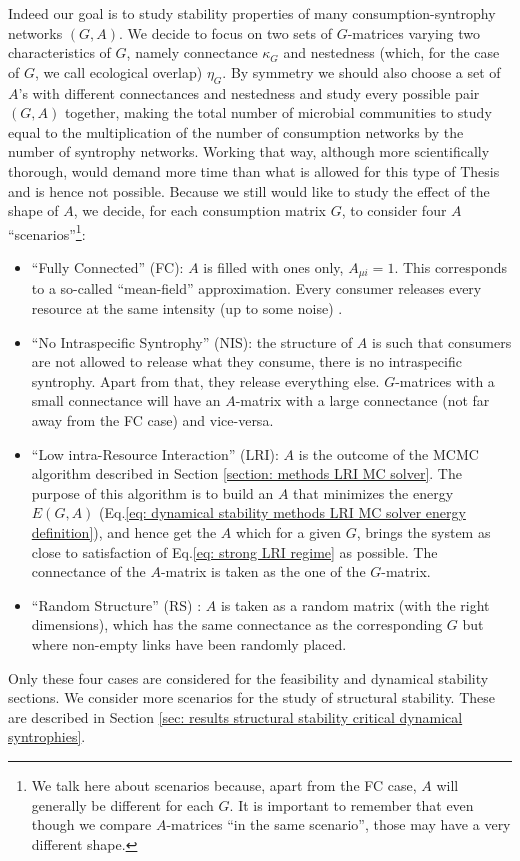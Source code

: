 \documentclass[12pt]{report}
\begin{document}
Indeed our goal is to study stability properties of many consumption-syntrophy networks $(G,A)$. We decide to focus on two sets of $G$-matrices varying two characteristics of $G$, namely connectance $\kappa_G$ and nestedness (which, for the case of $G$, we call ecological overlap) $\eta_G$. By symmetry we should also choose a set of $A$'s with different connectances and nestedness and study every possible pair $(G,A)$ together, making the total number of microbial communities to study equal to the multiplication of the number of consumption networks by the number of syntrophy networks. Working that way, although more scientifically thorough, would demand more time than what is allowed for this type of Thesis and is hence not possible. Because we still would like to study the effect of the shape of $A$, we decide, for each consumption matrix $G$, to consider four $A$ ``scenarios''\footnote{We talk here about scenarios because, apart from the FC case, $A$ will generally be different for each $G$. It is important to remember that even though we compare $A$-matrices ``in the same scenario'', those may have a very different shape.}:
\begin{itemize}
  \item ``Fully Connected'' (FC): $A$ is filled with ones only, $A_{\mu i}=1$. This corresponds to a so-called ``mean-field'' approximation. Every consumer releases every resource at the same intensity (up to some noise) .
  \item ``No Intraspecific Syntrophy'' (NIS): the structure of $A$ is such that consumers are not allowed to release what they consume, \ie there is no intraspecific syntrophy. Apart from that, they release everything else. $G$-matrices with a small connectance will have an $A$-matrix with a large connectance (not far away from the FC case) and vice-versa.
  \item ``Low intra-Resource Interaction'' (LRI): $A$ is the outcome of the MCMC algorithm %
 described in Section \ref{section: methods LRI MC solver}. The purpose of this algorithm is to build an $A$ that minimizes the energy $E(G,A)$ (Eq.\ref{eq: dynamical stability methods LRI MC solver energy definition}), and hence get the $A$ which for a given $G$, brings the system as close to satisfaction of Eq.\eqref{eq: strong LRI regime} as possible. The connectance of the $A$-matrix is taken as the one of the $G$-matrix.
 \item ``Random Structure'' (RS) : $A$ is taken as a random matrix (with the right dimensions), which has the same connectance as the corresponding $G$ but where non-empty links have been randomly placed.
 \end{itemize}
Only these four cases are considered for the feasibility and dynamical stability sections. We consider more scenarios for the study of structural stability. These are described in Section \ref{sec: results structural stability critical dynamical syntrophies}.
\end{document}
